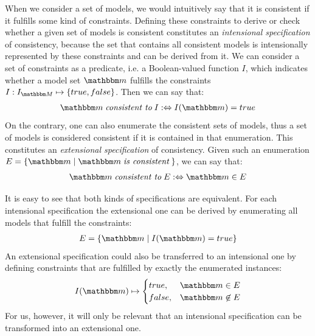 When we consider a set of models, we would intuitively say that it is consistent if it fulfills some kind of constraints.
Defining these constraints to derive or check whether a given set of models is consistent constitutes an \emph{intensional specification} of consistency, because the set that contains all consistent models is intensionally represented by these constraints and can be derived from it.
We can consider a set of constraints as a predicate, i.e. a Boolean-valued function $I$, which indicates whether a model set $\modelset{m}$ fulfills the constraints $I: \metamodelsetinstanceset{M} \mapsto \setted{true, false}$. Then we can say that:
\begin{align*}
    \modelset{m} \consistenttomath I \equivalentperdefinition I(\modelset{m}) = true
\end{align*}
On the contrary, one can also enumerate the consistent sets of models, thus a set of models is considered consistent if it is contained in that enumeration.
This constitutes an \emph{extensional specification} of consistency.
Given such an enumeration $E = \setted{\modelset{m} \mid \modelset{m} \mathtext{is consistent}}$, we can say that:
\begin{align*}
    \modelset{m} \consistenttomath E \equivalentperdefinition \modelset{m} \in E
\end{align*}

It is easy to see that both kinds of specifications are equivalent. For each intensional specification the extensional one can be derived by enumerating all models that fulfill the constraints:
\begin{align*}
    E = \setted{\modelset{m} \mid I(\modelset{m}) = true}
\end{align*}
An extensional specification could also be transferred to an intensional one by defining constraints that are fulfilled by exactly the enumerated instances:
\begin{align*}
    I(\modelset{m}) \mapsto 
    \begin{cases} 
        true, & \modelset{m} \in E\\
        false, & \modelset{m} \not\in E\\
    \end{cases}
\end{align*}
For us, however, it will only be relevant that an intensional specification can be transformed into an extensional one.


